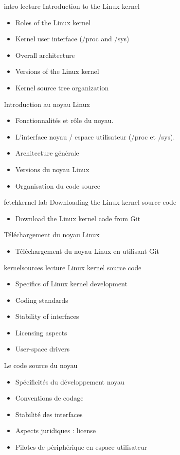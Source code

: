 {intro}
{lecture}
{Introduction to the Linux kernel}
{
  \begin{itemize}
  \item Roles of the Linux kernel
  \item Kernel user interface (/proc and /sys)
  \item Overall architecture
  \item Versions of the Linux kernel
  \item Kernel source tree organization
  \end{itemize}
}
{Introduction au noyau Linux}
{
  \begin{itemize}
  \item Fonctionnalités et rôle du noyau.
  \item L'interface noyau / espace utilisateur (/proc et /sys).
  \item Architecture générale
  \item Versions du noyau Linux
  \item Organisation du code source
  \end{itemize}
}
{fetchkernel}
{lab}
{Downloading the Linux kernel source code}
{
  \begin{itemize}
  \item Download the Linux kernel code from Git
  \end{itemize}
}
{Téléchargement du noyau Linux}
{
  \begin{itemize}
  \item Téléchargement du noyau Linux en utilisant Git
  \end{itemize}
}
{kernelsources}
{lecture}
{Linux kernel source code}
{
  \begin{itemize}
  \item Specifics of Linux kernel development
  \item Coding standards
  \item Stability of interfaces
  \item Licensing aspects
  \item User-space drivers
  \end{itemize}
}
{Le code source du noyau}
{
  \begin{itemize}
  \item Spécificités du développement noyau
  \item Conventions de codage
  \item Stabilité des interfaces
  \item Aspects juridiques : license
  \item Pilotes de périphérique en espace utilisateur
  \end{itemize}
}
